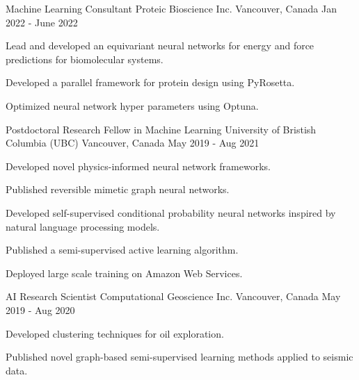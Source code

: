 

\begin{cventries}

  \cventry
    {Machine Learning Consultant} %
    {Proteic Bioscience Inc.} %
    {Vancouver, Canada} %
    {Jan 2022 - June 2022} %
    {
      \begin{cvitems} %
        \item {Lead and developed an equivariant neural networks for energy and force predictions for biomolecular systems.}
        \item {Developed a parallel framework for protein design using PyRosetta.}
        \item {Optimized neural network hyper parameters using Optuna.}
      \end{cvitems}
    }

  \cventry
    {Postdoctoral Research Fellow in Machine Learning} %
    {University of Bristish Columbia (UBC)} %
    {Vancouver, Canada} %
    {May 2019 - Aug 2021} %
    {
      \begin{cvitems} %
        \item {Developed novel physics-informed neural network frameworks.}
        \item {Published reversible mimetic graph neural networks.}
        \item {Developed self-supervised conditional probability neural networks inspired by natural language processing models.}
        \item {Published a semi-supervised active learning algorithm.}
        \item {Deployed large scale training on Amazon Web Services.}
      \end{cvitems}
    }

  \cventry
    {AI Research Scientist} %
    {Computational Geoscience Inc.} %
    {Vancouver, Canada} %
    {May 2019 - Aug 2020} %
    {
      \begin{cvitems} %
        \item {Developed clustering techniques for oil exploration.}
        \item {Published novel graph-based semi-supervised learning methods applied to seismic data.}
      \end{cvitems}
    }


\end{cventries}
